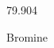 \documentclass[12pt]{article}
\begin{document}
\hfill{}
\vfill
\begin{center}
  {\fontsize{50}{60}
  }

  \vspace{1em}

  79.904

Bromine
\end{center}
\vfill
\end{document}
